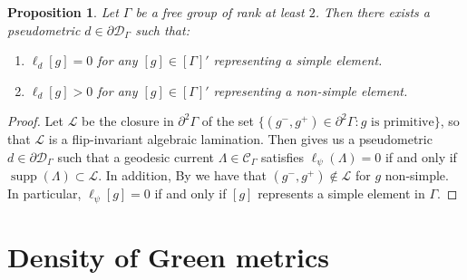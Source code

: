 \documentclass[twoside]{amsart}
\newtheorem{proposition}[theorem]{Proposition}
\theoremstyle{definition}
\numberwithin{equation}{section}
\numberwithin{theorem}{section}
\newcommand{\calC}{\mathcal{C}}
\newcommand{\calD}{\mathcal{D}}
\newcommand{\calL}{\mathcal{L}}
\newcommand{\G}{\Gamma}
\newcommand{\Lam}{\Lambda}
\newcommand{\p}{\psi}
\DeclareMathOperator{\supp}{supp}
\newcommand{\ppG}{\partial^2 \G}
\begin{document}
\begin{proposition}\label{prop:positiveonnonsimple_free}
    Let $\G$ be a free group of rank at least $2$. Then there exists a pseudometric $d\in \partial \calD_\G$ such that:
    \begin{enumerate}
        \item $\ell_{d}[g]=0$ for any $[g]\in [\G]'$ representing a simple element.
        \item $\ell_{d}[g]>0$ for any $[g]\in [\G]'$ representing a non-simple element.
\end{enumerate}
\end{proposition}










    




























\begin{proof}
   Let $\calL$ be the closure in $\ppG$ of the set $\{(g^-,g^+) \in \partial^2 \G : g \text{ is primitive}\}$, so that $\calL$ is a  flip-invariant algebraic lamination. 
   Then  gives us a pseudometric $d\in \partial \calD_\G$ such that a geodesic current $\Lam\in \calC_\G$ satisfies $\ell_\p(\Lam)=0$ if and only if $\supp(\Lam)\subset \calL$. In addition, By \cite[Lemma~5.4]{GuirardelHorbez2019} we have that $(g^-,g^+)\notin \calL$ for $g$ non-simple. In particular, $\ell_\p[g]=0$ if and only if $[g]$ represents a simple element in $\G$.
    \end{proof}





\section{Density of Green metrics}\label{sec:proofgreen}
\end{document}
